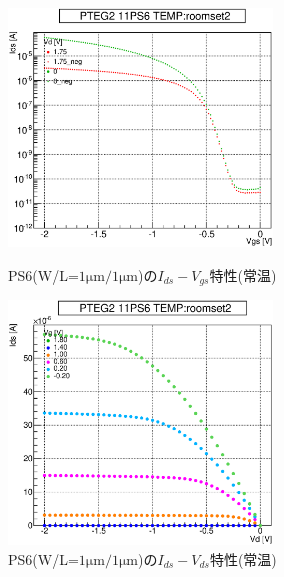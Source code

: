 				\begin{figure}[htbp]
					\begin{minipage}{0.5\hsize}
						\begin{center}
							\includegraphics[width=70mm]{./Chapter/Appendix/Picture/PST/PS6/PTEG2_11_PS6_IdVg_roomset2.eps}
						\end{center}
						\caption{PS6(W/L=$1\mathrm{\mu m}/1\mathrm{\mu m}$)の$I_{ds}-V_{gs}$特性(常温)}
						\label{fig:PS6_IdVg_room}
					\end{minipage}
					\begin{minipage}{0.5\hsize}
						\begin{center}
							\includegraphics[width=70mm]{./Chapter/Appendix/Picture/PST/PS6/PTEG2_11_PS6_IdVd_roomset2.eps}
						\end{center}
						\caption{PS6(W/L=$1\mathrm{\mu m}/1\mathrm{\mu m}$)の$I_{ds}-V_{ds}$特性(常温)}
						\label{fig:PS6_IdVd_room}
					\end{minipage}
				\end{figure}
